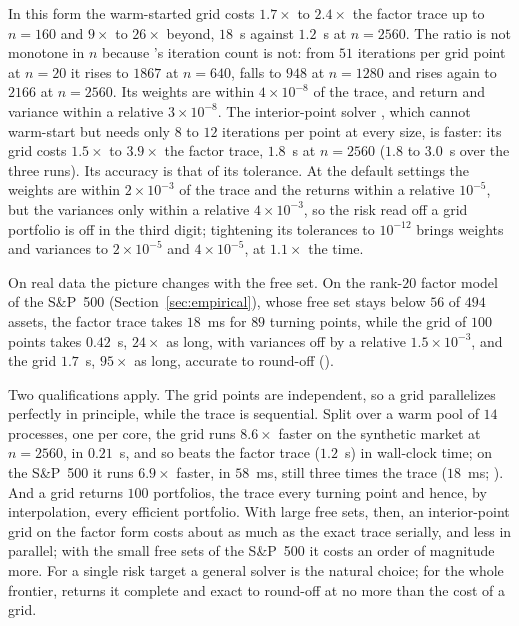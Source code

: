 In this form the warm-started  grid costs $1.7\times$ to $2.4\times$ the
factor trace up to $n=160$ and $9\times$ to $26\times$ beyond, $18$~s against $1.2$~s at
$n=2560$. The ratio is not monotone in $n$ because 's iteration count is not:
from $51$ iterations per grid point at $n=20$ it rises to $1867$ at $n=640$, falls to
$948$ at $n=1280$ and rises again to $2166$ at $n=2560$. Its weights are within
$4\times10^{-8}$ of the trace, and return and variance within a relative
$3\times10^{-8}$. The interior-point solver  \citep{goulart2024}, which
cannot warm-start but needs only $8$ to $12$ iterations per point at every size, is
faster: its grid costs $1.5\times$ to $3.9\times$ the factor trace, $1.8$~s at $n=2560$
($1.8$ to $3.0$~s over the three runs). Its accuracy is that of its tolerance. At the
default settings the weights are within $2\times10^{-3}$ of the trace and the returns
within a relative $10^{-5}$, but the variances only within a relative $4\times10^{-3}$, so
the risk read off a grid portfolio is off in the third digit; tightening its tolerances
to $10^{-12}$ brings weights and variances to $2\times10^{-5}$ and $4\times10^{-5}$, at
$1.1\times$ the time.

On real data the picture changes with the free set. On the rank-$20$ factor model of
the S\&P~500 (Section~\ref{sec:empirical}), whose free set stays below $56$ of $494$
assets, the factor trace takes $18$~ms for $89$ turning points, while the 
grid of $100$ points takes $0.42$~s, $24\times$ as long, with variances off by a relative
$1.5\times10^{-3}$, and the  grid $1.7$~s, $95\times$ as long, accurate to round-off
().

Two qualifications apply. The grid points are independent, so a grid parallelizes
perfectly in principle, while the trace is sequential. Split over a warm pool of $14$
processes, one per core, the  grid runs $8.6\times$ faster on the
synthetic market at $n=2560$, in $0.21$~s, and so beats the factor trace ($1.2$~s) in
wall-clock time; on the S\&P~500 it runs $6.9\times$ faster, in $58$~ms, still three
times the trace ($18$~ms; ). And a grid returns $100$ portfolios, the trace every
turning point and hence, by interpolation, every efficient portfolio. With large free
sets, then, an interior-point grid on the factor form costs about as much as the exact
trace serially, and less in parallel; with the small free sets of the S\&P~500 it costs an order of magnitude more. For a
single risk target a general solver is the natural choice; for the whole frontier,
 returns it complete and exact to round-off at no more than the cost of a
grid.

